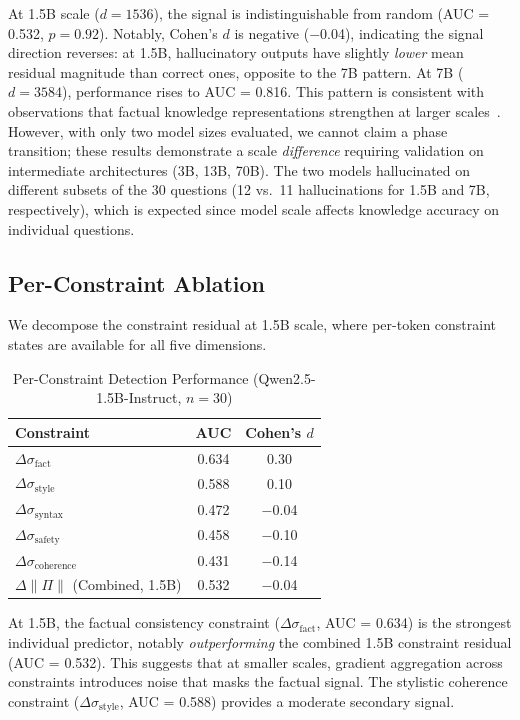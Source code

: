 \documentclass[11pt]{article}
\begin{document}
At 1.5B scale ($d = 1536$), the signal is indistinguishable from random (AUC = 0.532, $p = 0.92$). Notably, Cohen's $d$ is negative ($-$0.04), indicating the signal direction reverses: at 1.5B, hallucinatory outputs have slightly \textit{lower} mean residual magnitude than correct ones, opposite to the 7B pattern. At 7B ($d = 3584$), performance rises to AUC = 0.816. This pattern is consistent with observations that factual knowledge representations strengthen at larger scales~\cite{wei2022emergent}. However, with only two model sizes evaluated, we cannot claim a phase transition; these results demonstrate a scale \textit{difference} requiring validation on intermediate architectures (3B, 13B, 70B). The two models hallucinated on different subsets of the 30 questions (12 vs.\ 11 hallucinations for 1.5B and 7B, respectively), which is expected since model scale affects knowledge accuracy on individual questions.

\subsection{Per-Constraint Ablation}

We decompose the constraint residual at 1.5B scale, where per-token constraint states are available for all five dimensions.

\begin{table}[h]
\centering
\caption{Per-Constraint Detection Performance (Qwen2.5-1.5B-Instruct, $n = 30$)}
\label{tab:components}
\begin{tabular}{lcc}
\toprule
\textbf{Constraint} & \textbf{AUC} & \textbf{Cohen's $d$} \\
\midrule
$\Delta\sigma_{\text{fact}}$ & 0.634 & 0.30 \\
$\Delta\sigma_{\text{style}}$ & 0.588 & 0.10 \\
$\Delta\sigma_{\text{syntax}}$ & 0.472 & $-$0.04 \\
$\Delta\sigma_{\text{safety}}$ & 0.458 & $-$0.10 \\
$\Delta\sigma_{\text{coherence}}$ & 0.431 & $-$0.14 \\
\midrule
$\Delta\|\Pi\|$ (Combined, 1.5B) & 0.532 & $-$0.04 \\
\bottomrule
\end{tabular}
\end{table}

At 1.5B, the factual consistency constraint ($\Delta\sigma_{\text{fact}}$, AUC = 0.634) is the strongest individual predictor, notably \textit{outperforming} the combined 1.5B constraint residual (AUC = 0.532). This suggests that at smaller scales, gradient aggregation across constraints introduces noise that masks the factual signal. The stylistic coherence constraint ($\Delta\sigma_{\text{style}}$, AUC = 0.588) provides a moderate secondary signal.
\end{document}
